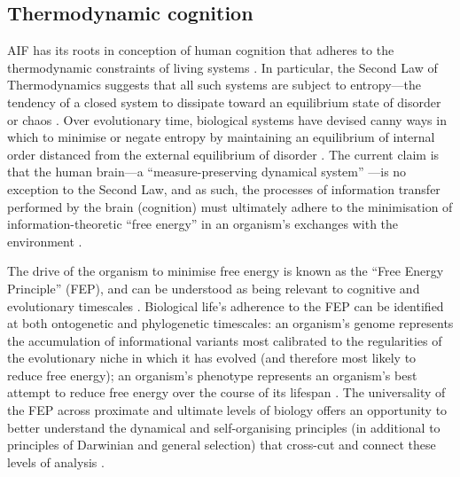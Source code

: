 \begin{CJK}{UTF8}{gbsn}
\subsection{Thermodynamic cognition\label{sect:thermoCog}}
AIF has its roots in conception of human cognition that adheres to the thermodynamic constraints of living systems \citep{Yufik2017}.  In particular, the Second Law of Thermodynamics suggests that all such systems are subject to entropy---the tendency of a closed system to dissipate toward an equilibrium state of disorder or chaos \citep{Wolfram2002}.  Over evolutionary time, biological systems have devised canny ways in which to minimise or negate entropy by maintaining an equilibrium of internal order distanced from the external equilibrium of disorder \citep{Schrodinger1944}.  The current claim is that the human brain---a ``measure-preserving dynamical system'' \citep{Friston2013}---is no exception to the Second Law, and as such, the processes of information transfer  performed by the brain (cognition) must ultimately adhere to the minimisation of information-theoretic ``free energy'' in an organism's exchanges with the environment \citep[entropy can be understood as the average quantity of free energy to which an organism is subject][]{Yufik2002,Yufik2013,Friston2010,Sengupta2013,Sengupta2016,Sengupta2017}.

The drive of the organism to minimise free energy is known as the ``Free Energy Principle'' (FEP), and can be understood as being relevant to cognitive and evolutionary timescales \citep[see][]{Friston2010}.  Biological life's adherence to the FEP can be identified at both ontogenetic and phylogenetic timescales: an organism's genome represents the accumulation of informational variants most calibrated to the regularities of the evolutionary niche in which it has evolved (and therefore most likely to reduce free energy); an organism's phenotype represents an organism's best attempt to reduce free energy over the course of its lifespan \citep{Ramstead2017}.  The universality of the FEP across proximate and ultimate levels of biology offers an opportunity to better understand the dynamical and self-organising principles (in additional to principles of Darwinian and general selection) that cross-cut and connect these levels of analysis \citep{Caporael2001,Badcock2012,Laland2015,Ramstead2017}.


\end{CJK}
